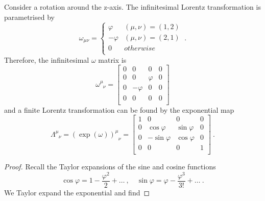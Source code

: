     \begin{example}
        Consider a rotation around the z-axis. The infinitesimal Lorentz transformation is parametrised by 
        \begin{equation*}
            \omega_{\mu\nu} = \begin{cases}
                \varphi & (\mu, \nu) = (1,2) \\
                - \varphi & (\mu, \nu) = (2,1) \\
                0 & otherwise \\
            \end{cases} ~.
        \end{equation*}
        Therefore, the infinitesimal $\omega$ matrix is 
        \begin{equation*}
            \omega^\mu_{\phantom \mu \nu} = \begin{bmatrix}
                0 & 0 & 0 & 0 \\
                0 & 0 & \varphi & 0 \\
                0 & -\varphi & 0 & 0 \\
                0 & 0 & 0 & 0 \\
            \end{bmatrix}
        \end{equation*}
        and a finite Lorentz transformation can be found by the exponential map
        \begin{equation*}
            \Lambda^\mu_{\phantom \mu \nu} = (\exp(\omega))^\mu_{\phantom \mu \nu} = \begin{bmatrix}
                1 & 0 & 0 & 0 \\
                0 & \cos \varphi & \sin \varphi & 0 \\
                0 & -\sin \varphi & \cos \varphi & 0 \\
                0 & 0 & 0 & 1 \\
            \end{bmatrix} ~.
        \end{equation*}
        \begin{proof}
            Recall the Taylor expansions of the sine and cosine functions
            \begin{equation*}
                \cos \varphi = 1 - \frac{\varphi^2}{2} + \ldots ~, \quad \sin \varphi = \varphi - \frac{\varphi^3}{3!} + \ldots ~.
            \end{equation*}
            We Taylor expand the exponential and find

\end{proof}
\end{example}
